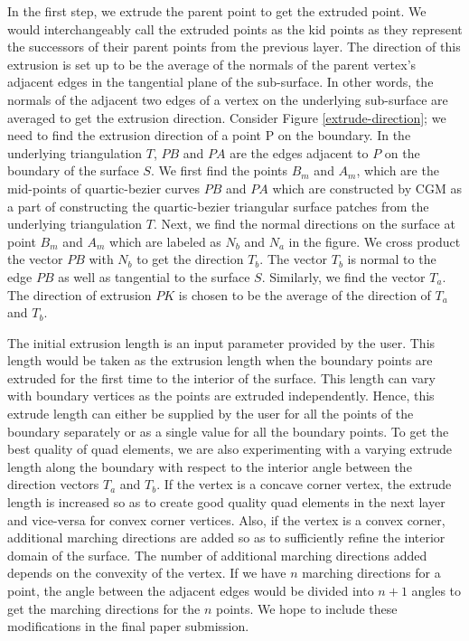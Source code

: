 \documentclass[conf]{new-aiaa}
\begin{document}
In the first step, we extrude the parent point to get the extruded point. We would interchangeably call the extruded points as the kid points as they represent the successors of their parent points from the previous layer. The direction of this extrusion is set up to be the average of the normals of the parent vertex's adjacent edges in the tangential plane of the sub-surface. In other words, the normals of the adjacent two edges of a vertex on the underlying sub-surface are averaged to get the extrusion direction. Consider Figure \ref{extrude-direction}; we need to find the extrusion direction of a point P on the boundary. In the underlying triangulation $T$, $PB$ and $PA$ are the edges adjacent to $P$ on the boundary of the surface $S$. We first find the points $B_m$ and $A_m$, which are the mid-points of quartic-bezier curves $PB$ and $PA$ which are constructed by CGM as a part of constructing the quartic-bezier triangular surface patches from the underlying triangulation $T$. Next, we find the normal directions on the surface at point $B_m$ and $A_m$ which are labeled as $N_b$ and $N_a$ in the figure. We cross product the vector $PB$ with $N_b$ to get the direction $T_b$. The vector $T_b$ is normal to the edge $PB$ as well as tangential to the surface $S$. Similarly, we find the vector $T_a$. The direction of extrusion $PK$ is chosen to be the average of the direction of $T_a$ and $T_b$.

The initial extrusion length is an input parameter provided by the user. This length would be taken as the extrusion length when the boundary points are extruded for the first time to the interior of the surface. This length can vary with boundary vertices as the points are extruded independently. Hence, this extrude length can either be supplied by the user for all the points of the boundary separately or as a single value for all the boundary points. To get the best quality of quad elements, we are also experimenting with a varying extrude length along the boundary with respect to the interior angle between the direction vectors $T_a$ and $T_b$. If the vertex is a concave corner vertex, the extrude length is increased so as to create good quality quad elements in the next layer and vice-versa for convex corner vertices. Also, if the vertex is a convex corner, additional marching directions are added so as to sufficiently refine the interior domain of the surface. The number of additional marching directions added depends on the convexity of the vertex. If we have $n$ marching directions for a point, the angle between the adjacent edges would be divided into $n+1$ angles to get the marching directions for the $n$ points. We hope to include these modifications in the final paper submission.
\end{document}
